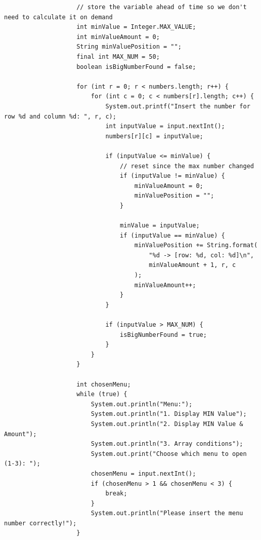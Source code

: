 \documentclass[12pt,titlepage]{article}
\begin{document}
\begin{enumerate}
{\begin{verbatim}
                    // store the variable ahead of time so we don't need to calculate it on demand
                    int minValue = Integer.MAX_VALUE;
                    int minValueAmount = 0;
                    String minValuePosition = "";
                    final int MAX_NUM = 50;
                    boolean isBigNumberFound = false;

                    for (int r = 0; r < numbers.length; r++) {
                        for (int c = 0; c < numbers[r].length; c++) {
                            System.out.printf("Insert the number for row %d and column %d: ", r, c);
                            int inputValue = input.nextInt();
                            numbers[r][c] = inputValue;

                            if (inputValue <= minValue) {
                                // reset since the max number changed
                                if (inputValue != minValue) {
                                    minValueAmount = 0;
                                    minValuePosition = "";
                                }

                                minValue = inputValue;
                                if (inputValue == minValue) {
                                    minValuePosition += String.format(
                                        "%d -> [row: %d, col: %d]\n",
                                        minValueAmount + 1, r, c
                                    );
                                    minValueAmount++;
                                }
                            }

                            if (inputValue > MAX_NUM) {
                                isBigNumberFound = true;
                            }
                        }
                    }

                    int chosenMenu;
                    while (true) {
                        System.out.println("Menu:");
                        System.out.println("1. Display MIN Value");
                        System.out.println("2. Display MIN Value & Amount");
                        System.out.println("3. Array conditions");
                        System.out.print("Choose which menu to open (1-3): ");
                        chosenMenu = input.nextInt();
                        if (chosenMenu > 1 && chosenMenu < 3) {
                            break;
                        }
                        System.out.println("Please insert the menu number correctly!");
                    }


\end{verbatim}}
\end{enumerate}
\end{document}
